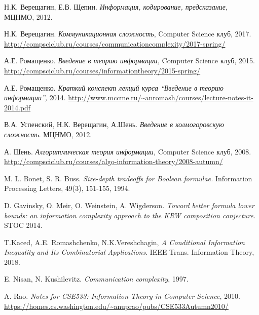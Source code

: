 \documentclass[12pt,sans]{article}
\theoremstyle{definition}
\theoremstyle{plain}
\theoremstyle{remark}
\begin{document}
\newpage
\begin{thebibliography}{9}
     Н.К. Верещагин, Е.В. Щепин. \emph{Информация, кодирование, предсказание}, МЦНМО, 2012.

     Н.К. Верещагин. \emph{Коммуникационная сложность}, Computer Science клуб, 2017.
        \url{http://compsciclub.ru/courses/communicationcomplexity/2017-spring/}

     А.Е. Ромащенко. \emph{Введение в теорию информации,} Computer Science клуб, 2015.
        \url{http://compsciclub.ru/courses/informationtheory/2015-spring/}

     А.Е. Ромащенко. \emph{Краткий конспект лекций курса ``Введение в теорию информации'',} 2014.
        \url{http://www.mccme.ru/~anromash/courses/lecture-notes-it-2014.pdf}

     В.А. Успенский, Н.К. Верещагин, А.Шень. \emph{Введение в колмогоровскую сложность}. МЦНМО, 2012.

     А. Шень. \emph{Алгоритмическая теория информации,} Computer Science клуб, 2008.
        \url{http://compsciclub.ru/courses/algo-information-theory/2008-autumn/}

     M. L. Bonet, S. R. Buss. \emph{Size-depth tradeoffs for Boolean formulae.} Information Processing Letters, 49(3), 151-155, 1994.

     D. Gavinsky, O. Meir, O. Weinstein, A. Wigderson. \emph{Toward better formula lower bounds:
    an information complexity approach to the KRW composition conjecture.} STOC 2014.

     T.Kaced, A.E. Romashchenko, N.K.Vereshchagin, \emph{A Conditional Information Inequality and Its Combinatorial Applications}.
    {{IEEE} Trans. Information Theory}, 2018.

     E. Nisan, N. Kushilevitz. \emph{Communication complexity}, 1997.

     A. Rao. \emph{Notes for CSE533: Information Theory in Computer Science}, 2010. \\ \url{https://homes.cs.washington.edu/~anuprao/pubs/CSE533Autumn2010/}

\end{thebibliography}
\end{document}
